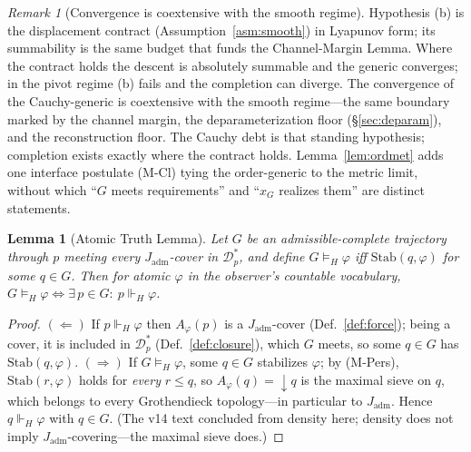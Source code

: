 \documentclass[11pt]{article}
\newtheorem{lemma}{Lemma}
\theoremstyle{definition}
\theoremstyle{remark}
\newtheorem*{remark}{Remark}
\newcommand{\forcesH}{\Vdash_{H}}
\newcommand{\refines}{\leq}
\newcommand{\Stab}{\mathrm{Stab}}
\newcommand{\Jadm}{J_{\mathrm{adm}}}
\begin{document}
\begin{remark}[Convergence is coextensive with the smooth regime]
Hypothesis (b) is the displacement contract (Assumption~\ref{asm:smooth}) in Lyapunov form; its
summability is the same budget that funds the Channel-Margin Lemma. Where the contract holds the descent is
absolutely summable and the generic converges; in the pivot regime (b) fails and the completion can
diverge.
 The convergence of the Cauchy-generic is coextensive with the smooth regime---the same
boundary marked by the channel margin, the deparameterization floor (\S\ref{sec:deparam}), and the
reconstruction floor. The Cauchy debt is that standing hypothesis; completion exists exactly where the
contract holds. Lemma~\ref{lem:ordmet} adds one interface postulate (M-Cl) tying the order-generic to
the metric limit, without which ``$G$ meets requirements'' and ``$x_G$ realizes them'' are distinct
statements.
\end{remark}

\begin{lemma}[Atomic Truth Lemma]\label{lem:atomic}
Let $G$ be an admissible-complete trajectory through $p$ meeting every $\Jadm$-cover in
$\mathcal{D}_p^\ast$, and define $G\models_H\varphi$ iff $\Stab(q,\varphi)$ for some $q\in G$. Then for
atomic $\varphi$ in the observer's countable vocabulary,
$G\models_H\varphi \iff \exists\,p\in G:\ p\forcesH\varphi$.
\end{lemma}

\begin{proof}
$(\Leftarrow)$ If $p\forcesH\varphi$ then $A_\varphi(p)$ is a $\Jadm$-cover (Def.~\ref{def:force});
being a cover, it is included in $\mathcal{D}_p^\ast$ (Def.~\ref{def:closure}), which $G$ meets, so
some $q\in G$ has $\Stab(q,\varphi)$. $(\Rightarrow)$ If $G\models_H\varphi$, some $q\in G$
stabilizes $\varphi$; by (M-Pers), $\Stab(r,\varphi)$ holds for \emph{every} $r\refines q$, so
$A_\varphi(q)={\downarrow}q$ is the maximal sieve on $q$, which belongs to every Grothendieck
topology---in particular to $\Jadm$. Hence $q\forcesH\varphi$ with $q\in G$. (The v14 text
concluded from density here; density does not imply $\Jadm$-covering---the maximal sieve does.)
\end{proof}
\end{document}
